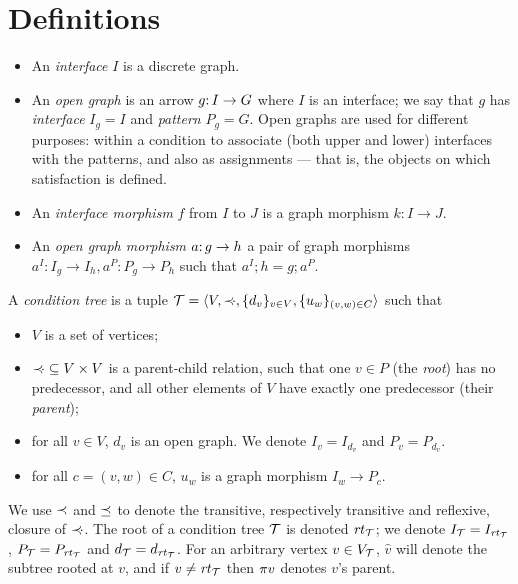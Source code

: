 \section{Definitions}
\label{sec:definitions}

\begin{itemize}
\item An \emph{interface} $I$ is a discrete graph.

\item An \emph{open graph} is an arrow $g{:}\, I\rightarrow G$ where $I$ is an interface; we say that $g$ has \emph{interface} $I_g=I$ and \emph{pattern} $P_g=G$. Open graphs are used for different purposes: within a condition to associate (both upper and lower) interfaces with the patterns, and also as assignments --- that is, the objects on which satisfaction is defined.

\item An \emph{interface morphism} $f$ from $I$ to $J$ is a graph morphism $k:I\to J$.

\item An \emph{open graph morphism} $a{:}\, g\rightarrow h$ a pair of graph morphisms $a^I:I_g\to I_h, a^P:P_g\to P_h$ such that $a^I;h=g;a^P$.
\end{itemize}
%
\begin{definition}\label{def:condition tree}
A \emph{condition tree} is a tuple ${\mathcal{T}}=\langle V, {\mathrel{\prec\mskip-8mu\cdot}}, \{{d_v}\}_{v\in V}, \{{u_w}\}_{(v,w)\in C}\rangle$ such that

\begin{itemize}[topsep=\smallskipamount]
\item $V$ is a set of vertices;

\item ${\mathrel{\prec\mskip-8mu\cdot}}\subseteq V\times V$ is a parent-child relation, such that one $v\in P$ (the \emph{root}) has no predecessor, and all other elements of $V$ have exactly one predecessor (their \emph{parent});

\item for all $v\in V$, $d_v$ is an open graph. We denote $I_v=I_{d_v}$ and $P_v=P_{d_v}$.

\item for all $c=(v,w)\in C$, $u_w$ is a graph morphism $I_w\to P_c$.
\end{itemize}
\end{definition}
%
We use $\prec$ and $\preceq$ to denote the transitive, respectively transitive and reflexive, closure of $\mathrel{\prec\mskip-8mu\cdot}$. The root of a condition tree ${\mathcal{T}}$ is denoted $\mathit{rt}_{{\mathcal{T}}}$; we denote $I_{\mathcal{T}}=I_{\mathit{rt}_{{\mathcal{T}}}}$, $P_{\mathcal{T}}=P_{\mathit{rt}_{{\mathcal{T}}}}$ and $d_{\mathcal{T}}=d_{\mathit{rt}_{{\mathcal{T}}}}$. For an arbitrary vertex $v\in V_{\mathcal{T}}$, $\hat v$ will denote the subtree rooted at $v$, and if $v\neq\mathit{rt}_{{\mathcal{T}}}$ then $\pi{v}$ denotes $v$'s parent.


